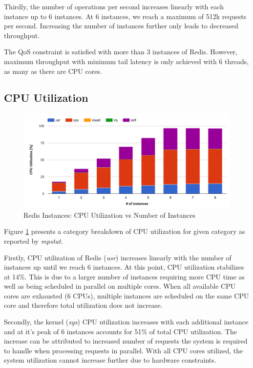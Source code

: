 Thirdly, the number of operations per second increases linearly with each instance up to 6 instances. At 6 instances, we reach a maximum of 512k requests per second. Increasing the number of instances further only leads to decreased throughput.

The QoS constraint is satisfied with more than 3 instances of Redis. However, maximum throughput with minimum tail latency is only achieved with 6 threads, as many as there are CPU cores.


\subsection{CPU Utilization}

\begin{figure}[h]
    \includegraphics[width=\textwidth]{./res2/r_instances_cpu.png}
    \caption{Redis Instances: CPU Utilization vs Number of Instances}
    \label{fig:r_instances_cpu.png}
\end{figure}

Figure \ref{fig:r_instances_cpu.png} presents a category breakdown of CPU utilization for given category as reported by \textit{mpstat}.

Firstly, CPU utilization of Redis (\textit{usr}) increases linearly with the number of instances up until we reach 6 instances. At this point, CPU utilization stabilizes at 14\%. This is due to a larger number of instances requiring more CPU time as well as being scheduled in parallel on multiple cores. When all available CPU cores are exhausted (6 CPUs), multiple instances are scheduled on the same CPU core and therefore total utilization does not increase.

Secondly, the kernel (\textit{sys}) CPU utilization increases with each additional instance and at it's peak of 6 instances accounts for 51\% of total CPU utilization. The increase can be attributed to increased number of requests the system is required to handle when processing requests in parallel. With all CPU cores utilized, the system utilization cannot increase further due to hardware constraints.

